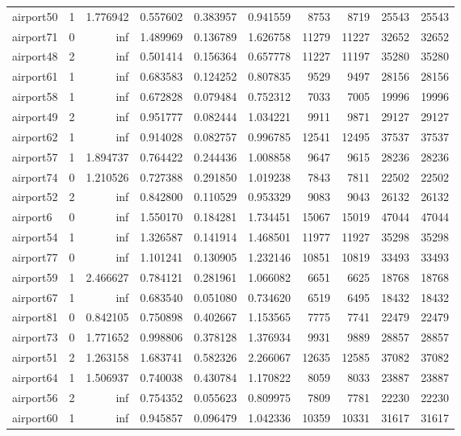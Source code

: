 \begin{longtable}{|l|r|r|r|r|r|r|r|r|r|}
airport50 & 1 & 1.776942 & 0.557602 & 0.383957 & 0.941559 & 8753 & 8719 & 25543 & 25543 \\
airport71 & 0 & inf & 1.489969 & 0.136789 & 1.626758 & 11279 & 11227 & 32652 & 32652 \\
airport48 & 2 & inf & 0.501414 & 0.156364 & 0.657778 & 11227 & 11197 & 35280 & 35280 \\
airport61 & 1 & inf & 0.683583 & 0.124252 & 0.807835 & 9529 & 9497 & 28156 & 28156 \\
airport58 & 1 & inf & 0.672828 & 0.079484 & 0.752312 & 7033 & 7005 & 19996 & 19996 \\
airport49 & 2 & inf & 0.951777 & 0.082444 & 1.034221 & 9911 & 9871 & 29127 & 29127 \\
airport62 & 1 & inf & 0.914028 & 0.082757 & 0.996785 & 12541 & 12495 & 37537 & 37537 \\
airport57 & 1 & 1.894737 & 0.764422 & 0.244436 & 1.008858 & 9647 & 9615 & 28236 & 28236 \\
airport74 & 0 & 1.210526 & 0.727388 & 0.291850 & 1.019238 & 7843 & 7811 & 22502 & 22502 \\
airport52 & 2 & inf & 0.842800 & 0.110529 & 0.953329 & 9083 & 9043 & 26132 & 26132 \\
airport6 & 0 & inf & 1.550170 & 0.184281 & 1.734451 & 15067 & 15019 & 47044 & 47044 \\
airport54 & 1 & inf & 1.326587 & 0.141914 & 1.468501 & 11977 & 11927 & 35298 & 35298 \\
airport77 & 0 & inf & 1.101241 & 0.130905 & 1.232146 & 10851 & 10819 & 33493 & 33493 \\
airport59 & 1 & 2.466627 & 0.784121 & 0.281961 & 1.066082 & 6651 & 6625 & 18768 & 18768 \\
airport67 & 1 & inf & 0.683540 & 0.051080 & 0.734620 & 6519 & 6495 & 18432 & 18432 \\
airport81 & 0 & 0.842105 & 0.750898 & 0.402667 & 1.153565 & 7775 & 7741 & 22479 & 22479 \\
airport73 & 0 & 1.771652 & 0.998806 & 0.378128 & 1.376934 & 9931 & 9889 & 28857 & 28857 \\
airport51 & 2 & 1.263158 & 1.683741 & 0.582326 & 2.266067 & 12635 & 12585 & 37082 & 37082 \\
airport64 & 1 & 1.506937 & 0.740038 & 0.430784 & 1.170822 & 8059 & 8033 & 23887 & 23887 \\
airport56 & 2 & inf & 0.754352 & 0.055623 & 0.809975 & 7809 & 7781 & 22230 & 22230 \\
airport60 & 1 & inf & 0.945857 & 0.096479 & 1.042336 & 10359 & 10331 & 31617 & 31617 \\

\end{longtable}
